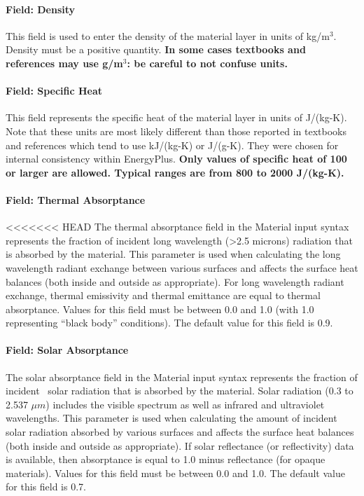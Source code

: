 \paragraph{Field: Density}\label{field-density}

This field is used to enter the density of the material layer in units of kg/m\(^{3}\). Density must be a positive quantity. \textbf{In some cases textbooks and references may use g/m\(^{3}\): be careful to not confuse units.}

\paragraph{Field: Specific Heat}\label{field-specific-heat}

This field represents the specific heat of the material layer in units of J/(kg-K). Note that these units are most likely different than those reported in textbooks and references which tend to use kJ/(kg-K) or J/(g-K). They were chosen for internal consistency within EnergyPlus. \textbf{Only values of specific heat of 100 or larger are allowed. Typical ranges are from 800 to 2000 J/(kg-K).}

\paragraph{Field: Thermal Absorptance}\label{field-thermal-absorptance}

<<<<<<< HEAD
The thermal absorptance field in the Material input syntax represents the fraction of incident long wavelength (>2.5 microns) radiation that is absorbed by the material. This parameter is used when calculating the long wavelength radiant exchange between various surfaces and affects the surface heat balances (both inside and outside as appropriate). For long wavelength radiant exchange, thermal emissivity and thermal emittance are equal to thermal absorptance. Values for this field must be between 0.0 and 1.0 (with 1.0 representing ``black body'' conditions). The default value for this field is 0.9.

\paragraph{Field: Solar Absorptance}\label{field-solar-absorptance}

The solar absorptance field in the Material input syntax represents the fraction of incident~ solar radiation that is absorbed by the material. Solar radiation (0.3 to 2.537 $\mu{}m$) includes the visible spectrum as well as infrared and ultraviolet wavelengths. This parameter is used when calculating the amount of incident solar radiation absorbed by various surfaces and affects the surface heat balances (both inside and outside as appropriate). If solar reflectance (or reflectivity) data is available, then absorptance is equal to 1.0 minus reflectance (for opaque materials). Values for this field must be between 0.0 and 1.0. The default value for this field is 0.7.

